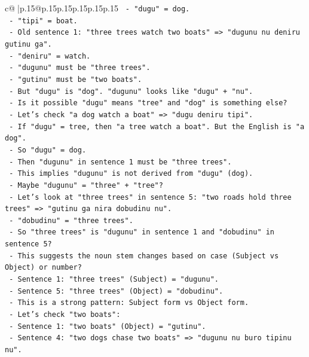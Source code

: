 \documentclass{article}
\begin{document}
{\begin{supertabular}{c@{$\;$}|p{.15\linewidth}@{}p{.15\linewidth}p{.15\linewidth}p{.15\linewidth}p{.15\linewidth}p{.15\linewidth}}
{{{\texttt{      {-} "dugu" = dog.} \\
\texttt{      {-} "tipi" = boat.} \\
\texttt{    {-} Old sentence 1: "three trees watch two boats" => "dugunu nu deniru gutinu ga".} \\
\texttt{      {-} "deniru" = watch.} \\
\texttt{      {-} "dugunu" must be "three trees".} \\
\texttt{      {-} "gutinu" must be "two boats".} \\
\texttt{    {-} But "dugu" is "dog". "dugunu" looks like "dugu" + "nu".} \\
\texttt{    {-} Is it possible "dugu" means "tree" and "dog" is something else?} \\
\texttt{    {-} Let's check "a dog watch a boat" => "dugu deniru tipi".} \\
\texttt{      {-} If "dugu" = tree, then "a tree watch a boat". But the English is "a dog".} \\
\texttt{      {-} So "dugu" = dog.} \\
\texttt{    {-} Then "dugunu" in sentence 1 must be "three trees".} \\
\texttt{    {-} This implies "dugunu" is not derived from "dugu" (dog).} \\
\texttt{    {-} Maybe "dugunu" = "three" + "tree"?} \\
\texttt{    {-} Let's look at "three trees" in sentence 5: "two roads hold three trees" => "gutinu ga nira dobudinu nu".} \\
\texttt{      {-} "dobudinu" = "three trees".} \\
\texttt{      {-} So "three trees" is "dugunu" in sentence 1 and "dobudinu" in sentence 5?} \\
\texttt{      {-} This suggests the noun stem changes based on case (Subject vs Object) or number?} \\
\texttt{      {-} Sentence 1: "three trees" (Subject) = "dugunu".} \\
\texttt{      {-} Sentence 5: "three trees" (Object) = "dobudinu".} \\
\texttt{      {-} This is a strong pattern: Subject form vs Object form.} \\
\texttt{      {-} Let's check "two boats":} \\
\texttt{        {-} Sentence 1: "two boats" (Object) = "gutinu".} \\
\texttt{        {-} Sentence 4: "two dogs chase two boats" => "dugunu nu buro tipinu nu".} \\
}}}
\end{supertabular}}
\end{document}
